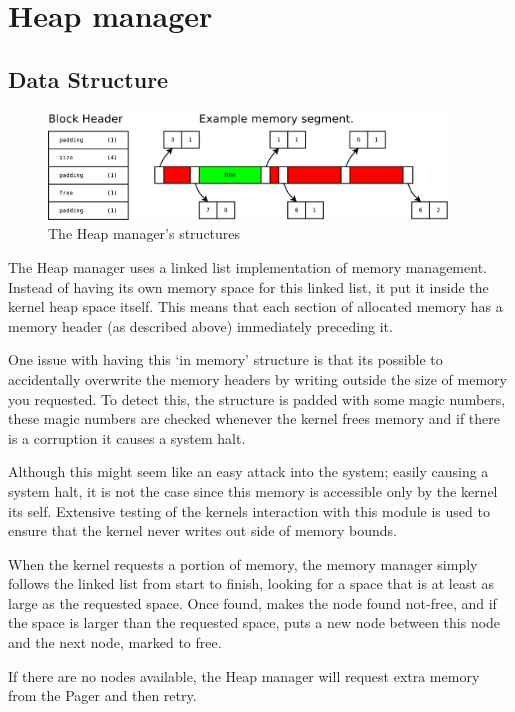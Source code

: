 \documentclass[a4paper]{report}
\begin{document}
\section{Heap manager}

\subsection{Data Structure}

\begin{figure}[ht]
\centering
\includegraphics[width=400px]{images/Heap_Manager}
\caption{The Heap manager's structures}
\label{fig:WinTitleBarScreen}
\end{figure}

The Heap manager uses a linked list implementation of memory management. Instead of having its own memory space for this linked list, it put it inside the kernel heap space itself. This means that each section of allocated memory has a memory header (as described above) immediately preceding it.

One issue with having this `in memory' structure is that its possible to accidentally overwrite the memory headers by writing outside the size of memory you requested. To detect this, the structure is padded with some magic numbers, these magic numbers are checked whenever the kernel frees memory and if there is a corruption it causes a system halt.

Although this might seem like an easy attack into the system; easily causing a system halt, it is not the case since this memory is accessible only by the kernel its self. Extensive testing of the kernels interaction with this module is used to ensure that the kernel never writes out side of memory bounds.

When the kernel requests a portion of memory, the memory manager simply follows the linked list from start to finish, looking for a space that is at least as large as the requested space. Once found, makes the node found not-free, and if the space is larger than the requested space, puts a new node between this node and the next node, marked to free.

If there are no nodes available, the Heap manager will request extra memory from the Pager and then retry.
\end{document}
